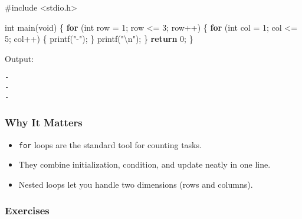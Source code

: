 \documentclass[
  letterpaper,
  DIV=11,
  numbers=noendperiod]{scrreprt}
\newenvironment{Shaded}{\begin{snugshade}}{\end{snugshade}}
\newcommand{\ControlFlowTok}[1]{\textcolor[rgb]{0.00,0.23,0.31}{\textbf{#1}}}
\newcommand{\DataTypeTok}[1]{\textcolor[rgb]{0.68,0.00,0.00}{#1}}
\newcommand{\DecValTok}[1]{\textcolor[rgb]{0.68,0.00,0.00}{#1}}
\newcommand{\ImportTok}[1]{\textcolor[rgb]{0.00,0.46,0.62}{#1}}
\newcommand{\NormalTok}[1]{\textcolor[rgb]{0.00,0.23,0.31}{#1}}
\newcommand{\OperatorTok}[1]{\textcolor[rgb]{0.37,0.37,0.37}{#1}}
\newcommand{\PreprocessorTok}[1]{\textcolor[rgb]{0.68,0.00,0.00}{#1}}
\newcommand{\SpecialCharTok}[1]{\textcolor[rgb]{0.37,0.37,0.37}{#1}}
\newcommand{\StringTok}[1]{\textcolor[rgb]{0.13,0.47,0.30}{#1}}
\providecommand{\tightlist}{%
  \setlength{\itemsep}{0pt}\setlength{\parskip}{0pt}}
\begin{document}
\begin{Shaded}
\begin{Highlighting}[]
\PreprocessorTok{\#include }\ImportTok{\textless{}stdio.h\textgreater{}}

\DataTypeTok{int}\NormalTok{ main}\OperatorTok{(}\DataTypeTok{void}\OperatorTok{)} \OperatorTok{\{}
    \ControlFlowTok{for} \OperatorTok{(}\DataTypeTok{int}\NormalTok{ row }\OperatorTok{=} \DecValTok{1}\OperatorTok{;}\NormalTok{ row }\OperatorTok{\textless{}=} \DecValTok{3}\OperatorTok{;}\NormalTok{ row}\OperatorTok{++)} \OperatorTok{\{}
        \ControlFlowTok{for} \OperatorTok{(}\DataTypeTok{int}\NormalTok{ col }\OperatorTok{=} \DecValTok{1}\OperatorTok{;}\NormalTok{ col }\OperatorTok{\textless{}=} \DecValTok{5}\OperatorTok{;}\NormalTok{ col}\OperatorTok{++)} \OperatorTok{\{}
\NormalTok{            printf}\OperatorTok{(}\StringTok{"{-}"}\OperatorTok{);}
        \OperatorTok{\}}
\NormalTok{        printf}\OperatorTok{(}\StringTok{"}\SpecialCharTok{\textbackslash{}n}\StringTok{"}\OperatorTok{);}
    \OperatorTok{\}}
    \ControlFlowTok{return} \DecValTok{0}\OperatorTok{;}
\OperatorTok{\}}
\end{Highlighting}
\end{Shaded}

Output:

\begin{verbatim}
-
-
-
\end{verbatim}

\subsubsection{Why It Matters}\label{why-it-matters-17}

\begin{itemize}
\tightlist
\item
  \texttt{for} loops are the standard tool for counting tasks.
\item
  They combine initialization, condition, and update neatly in one line.
\item
  Nested loops let you handle two dimensions (rows and columns).
\end{itemize}

\subsubsection{Exercises}\label{exercises-18}
\end{document}
